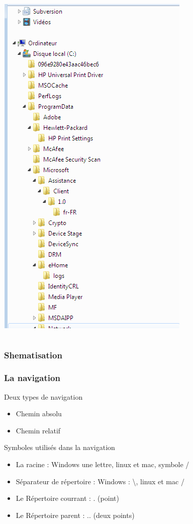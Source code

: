 \documentclass{beamer}
\begin{document}
\begin{frame}
\begin{columns}
\begin{column}[c]{5cm}
				\includegraphics[scale=0.25]{image/ArboWin.png}
			\end{column}
		\end{columns}
\end{frame}

\begin{frame}
		\frametitle{Shematisation}
		\begin{center}
			
		\end{center}
\end{frame}	

\begin{frame}
		\frametitle{La navigation}
		\begin{block}{Deux types de navigation}
			\begin{itemize}
				\item Chemin absolu
				\item Chemin relatif
			\end{itemize}
		\end{block}
		\begin{block}{Symboles utilisés dans la navigation}
			\begin{itemize}
				\item La racine : Windows une lettre, linux et mac, symbole / 
				\item Séparateur de répertoire : Windows : \textbackslash, linux et mac  /
				\item Le Répertoire courrant : . (point)
				\item Le Répertoire parent : .. (deux points)
			\end{itemize}
		\end{block}
\end{frame}
\end{document}
